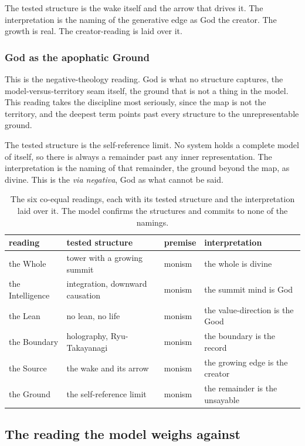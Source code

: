 The tested structure is the wake itself and the arrow that drives it. The interpretation is the naming of the generative edge as God the creator. The growth is real. The creator-reading is laid over it.

\subsubsection{God as the apophatic Ground}

This is the negative-theology reading. God is what no structure captures, the model-versus-territory seam itself, the ground that is not a thing in the model. This reading takes the discipline most seriously, since the map is not the territory, and the deepest term points past every structure to the unrepresentable ground.

The tested structure is the self-reference limit. No system holds a complete model of itself, so there is always a remainder past any inner representation. The interpretation is the naming of that remainder, the ground beyond the map, as divine. This is the \emph{via negativa}, God as what cannot be said.

\begin{table}[ht]
\centering
\begin{tabular}{@{}llll@{}}
\toprule
reading & tested structure & premise & interpretation \\
\midrule
the Whole & tower with a growing summit & monism & the whole is divine \\
the Intelligence & integration, downward causation & monism & the summit mind is God \\
the Lean & no lean, no life & monism & the value-direction is the Good \\
the Boundary & holography, Ryu-Takayanagi & monism & the boundary is the record \\
the Source & the wake and its arrow & monism & the growing edge is the creator \\
the Ground & the self-reference limit & monism & the remainder is the unsayable \\
\bottomrule
\end{tabular}
\caption{The six co-equal readings, each with its tested structure and the interpretation laid over it. The model confirms the structures and commits to none of the namings.}
\label{tab:six-readings}
\end{table}

\subsection{The reading the model weighs against}

